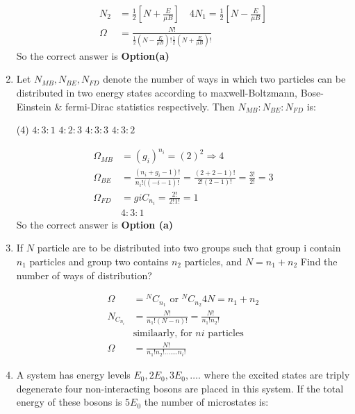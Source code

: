 \begin{enumerate}
\begin{answer}
\begin{align*}
	N_{2}&=\frac{1}{2}\left[N+\frac{E}{\mu B}\right] \quad 4 N_{1}=\frac{1}{2}\left[N-\frac{E}{\mu B}\right]\\
	\Omega&=\frac{N !}{\frac{1}{2}\left(N-\frac{E}{\mu B}\right) ! \frac{1}{2}\left(N+\frac{E}{\mu B}\right) !}
	\end{align*}
	So the correct answer is \textbf{Option(a)}
\end{answer}	
\item Let $N_{M B}, N_{B E}, N_{F D}$ denote the number of ways in which two particles can be distributed in two energy states according to maxwell-Boltzmann, Bose-Einstein \& fermi-Dirac statistics respectively. Then $N_{M B}: N_{B E}: N_{F D}$ is:
\begin{tasks}(4)
	\task[\textbf{a.}]$4: 3: 1$
	\task[\textbf{b.}] $4: 2: 3$
	\task[\textbf{c.}]$4: 3: 3$
	\task[\textbf{d.}] $4: 3: 2$
\end{tasks}
\begin{answer}
	\begin{align*}
	\Omega_{M B}&=\left(g_{i}\right)^{n_{i}}=(2)^{2} \Rightarrow 4 \\
	\Omega_{B E}&=\frac{\left(n_{i}+g_{i}-1\right) !}{n_{i} !((-i-1) !}=\frac{(2+2-1) !}{2 !(2-1) !}=\frac{3 !}{2 !}=3\\
	\Omega_{F D}&=g i C_{n_{i}}=\frac{2 !}{2 ! 1 !}=1\\
	&4:3:1
	\end{align*}
	So the correct answer is \textbf{Option (a)}
\end{answer}
\item  If $N$ particle are to be distributed into two groups such that group i contain $n_1$ particles and group two contains $n_2$ particles, and $N=n_1+n_2$ Find the number of ways of distribution?
\begin{answer}
	\begin{align*}
	\Omega&={ }^{N} C_{n_{1}} \text { or }{ }^{N} C_{n_{2}} 4 N=n_{1}+n_{2}\\
	N_{C_{n_{i}}}&=\frac{N !}{n_{1} !(N-n) !}=\frac{N !}{n_{1} ! n_{2} !}\\
	&\text{similaarly, for $ni$ particles}\\
	\Omega&=\frac{N!}{n_1!n_2!.......n_i!}
	\end{align*}
\end{answer}
\item  A system has energy levels $E_{0}, 2 E_{0}, 3 E_{0}, \ldots .$ where the excited states are triply degenerate four non-interacting bosons are placed in this system. If the total energy of these bosons is $5E_0$ the number of microstates is:

\end{enumerate}
